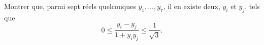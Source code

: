 Montrer que, parmi sept réels quelconques $y_1, \ldots, y_7$, il en existe deux, $y_i$ et $y_j$, tels que
\[ 0 \leq \frac{y_i - y_j}{1 + y_iy_j} \leq \frac{1}{\sqrt{3}}. \]
